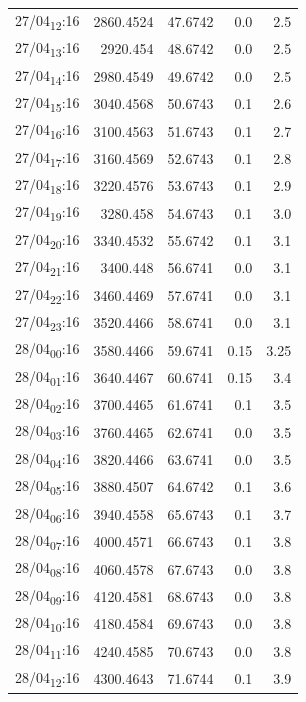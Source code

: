 \documentclass[11pt]{article}
\begin{document}
\begin{table}[htbp]
\begin{tabular}{lrrrr}
27/04\textsubscript{12}:16 & 2860.4524 & 47.6742 & 0.0 & 2.5\\[0pt]
27/04\textsubscript{13}:16 & 2920.454 & 48.6742 & 0.0 & 2.5\\[0pt]
27/04\textsubscript{14}:16 & 2980.4549 & 49.6742 & 0.0 & 2.5\\[0pt]
27/04\textsubscript{15}:16 & 3040.4568 & 50.6743 & 0.1 & 2.6\\[0pt]
27/04\textsubscript{16}:16 & 3100.4563 & 51.6743 & 0.1 & 2.7\\[0pt]
27/04\textsubscript{17}:16 & 3160.4569 & 52.6743 & 0.1 & 2.8\\[0pt]
27/04\textsubscript{18}:16 & 3220.4576 & 53.6743 & 0.1 & 2.9\\[0pt]
27/04\textsubscript{19}:16 & 3280.458 & 54.6743 & 0.1 & 3.0\\[0pt]
27/04\textsubscript{20}:16 & 3340.4532 & 55.6742 & 0.1 & 3.1\\[0pt]
27/04\textsubscript{21}:16 & 3400.448 & 56.6741 & 0.0 & 3.1\\[0pt]
27/04\textsubscript{22}:16 & 3460.4469 & 57.6741 & 0.0 & 3.1\\[0pt]
27/04\textsubscript{23}:16 & 3520.4466 & 58.6741 & 0.0 & 3.1\\[0pt]
28/04\textsubscript{00}:16 & 3580.4466 & 59.6741 & 0.15 & 3.25\\[0pt]
28/04\textsubscript{01}:16 & 3640.4467 & 60.6741 & 0.15 & 3.4\\[0pt]
28/04\textsubscript{02}:16 & 3700.4465 & 61.6741 & 0.1 & 3.5\\[0pt]
28/04\textsubscript{03}:16 & 3760.4465 & 62.6741 & 0.0 & 3.5\\[0pt]
28/04\textsubscript{04}:16 & 3820.4466 & 63.6741 & 0.0 & 3.5\\[0pt]
28/04\textsubscript{05}:16 & 3880.4507 & 64.6742 & 0.1 & 3.6\\[0pt]
28/04\textsubscript{06}:16 & 3940.4558 & 65.6743 & 0.1 & 3.7\\[0pt]
28/04\textsubscript{07}:16 & 4000.4571 & 66.6743 & 0.1 & 3.8\\[0pt]
28/04\textsubscript{08}:16 & 4060.4578 & 67.6743 & 0.0 & 3.8\\[0pt]
28/04\textsubscript{09}:16 & 4120.4581 & 68.6743 & 0.0 & 3.8\\[0pt]
28/04\textsubscript{10}:16 & 4180.4584 & 69.6743 & 0.0 & 3.8\\[0pt]
28/04\textsubscript{11}:16 & 4240.4585 & 70.6743 & 0.0 & 3.8\\[0pt]
28/04\textsubscript{12}:16 & 4300.4643 & 71.6744 & 0.1 & 3.9\\[0pt]

\end{tabular}
\end{table}
\end{document}

